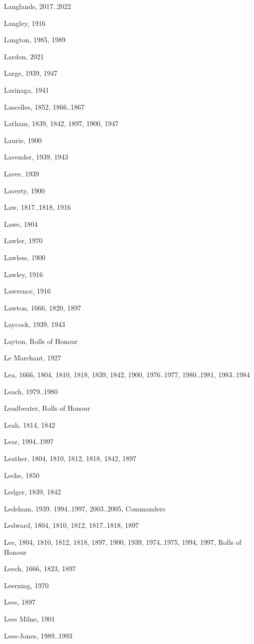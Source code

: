 \begin{theindex}
\item Langlands, 2017..2022
\item Langley, 1916
\item Langton, 1985, 1989
\item Lardon, 2021
\item Large, 1939, 1947
\item Larinaga, 1941
\item Lascelles, 1852, 1866..1867
\item Latham, 1839, 1842, 1897, 1900, 1947
\item Laurie, 1900
\item Lavender, 1939, 1943
\item Laver, 1939
\item Laverty, 1900
\item Law, 1817..1818, 1916
\item Lawe, 1804
\item Lawler, 1970
\item Lawless, 1900
\item Lawley, 1916
\item Lawrence, 1916
\item Lawton, 1666, 1820, 1897
\item Laycock, 1939, 1943
\item Layton, Rolls of Honour
\item Le Marchant, 1927
\item Lea, 1666, 1804, 1810, 1818, 1839, 1842, 1900, 1976..1977, 1980..1981, 1983..1984
\item Leach, 1979..1980
\item Leadbeater, Rolls of Honour
\item Leah, 1814, 1842
\item Lear, 1994..1997
\item Leather, 1804, 1810, 1812, 1818, 1842, 1897
\item Leche, 1850
\item Ledger, 1839, 1842
\item Ledsham, 1939, 1994..1997, 2003..2005, Commanders
\item Ledward, 1804, 1810, 1812, 1817..1818, 1897
\item Lee, 1804, 1810, 1812, 1818, 1897, 1900, 1939, 1974..1975, 1994, 1997, Rolls of Honour
\item Leech, 1666, 1823, 1897
\item Leerning, 1970
\item Lees, 1897
\item Lees Milne, 1901
\item Lees-Jones, 1989..1993

\end{theindex}
